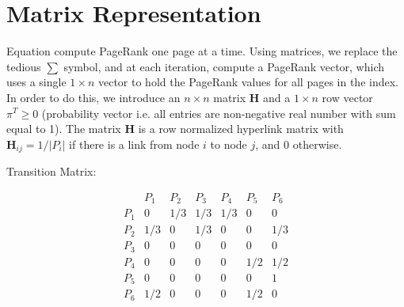 \section{Matrix Representation}

Equation compute PageRank one page at a time. Using matrices, we replace the tedious $\sum$ symbol, and at each iteration, compute a PageRank vector, which uses a single $1 \times n$ vector to hold the PageRank values for all pages in the index. In order to do this, we introduce an $n \times n$ matrix $\mathbf{H}$ and a $1 \times n$ row vector ${\pi}^{T}\geq0$ (probability vector i.e. all entries are non-negative real number with sum equal to 1). The matrix $\mathbf{H}$ is a row normalized hyperlink matrix with $\mathbf{H}_{i j}=1 /\left|P_{i}\right|$ if there is a link from node $i$ to node $j$, and 0 otherwise.
	
\begin{center}
\end{center}
	
\noindent Transition Matrix:

$$
\begin{array}{ccccccc} 
	& P_{1} & P_{2} & P_{3} & P_{4} & P_{5} & P_{6} \\
	P_{1} & 0 & 1 / 3 & 1 / 3 & 1 / 3 & 0 & 0 \\
	P_{2} & 1 / 3 & 0 & 1 / 3 & 0 & 0 & 1 / 3 \\
	P_{3} & 0 & 0 & 0 & 0 & 0 & 0 \\
	P_{4} & 0 & 0 & 0 & 0 & 1 / 2 & 1 / 2 \\
	P_{5} & 0 & 0 & 0 & 0 & 0 & 1 \\
	P_{6} & 1 / 2 & 0 & 0 & 0 & 1 / 2 & 0
\end{array}
$$

